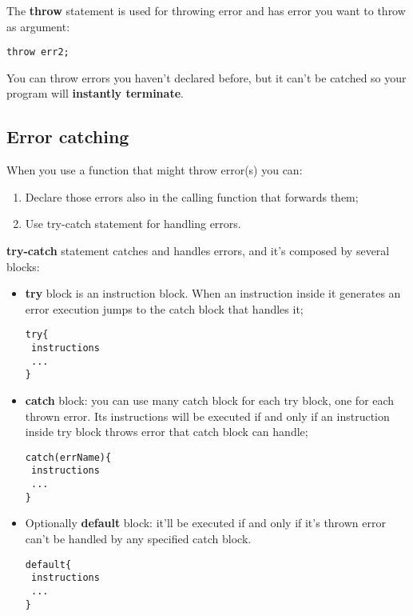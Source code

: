 \documentclass[10pt]{book}%
\renewcommand{\emph}[1]{\textbf{#1}}
\newenvironment{codeenv}{
\begin{mdframed}[backgroundcolor=black!20,topline=false,leftline=false,rightline=false,bottomline=false]
}
{\end{mdframed}}
\begin{document}
The \emph{throw} statement is used for throwing error and has error you want to throw as argument:
\begin{codeenv}
\begin{verbatim}
throw err2;
\end{verbatim}
\end{codeenv}

You can throw errors you haven't declared before, but it can't be catched so your program will \emph{instantly terminate}.

\subsection{Error catching}
When you use a function that might throw error(s) you can:
\begin{enumerate}
\item Declare those errors also in the calling function that forwards them;
\item Use try-catch statement for handling errors. 
\end{enumerate}
\emph{try-catch} statement catches and handles errors, and it's composed by several blocks:
\begin{itemize}
\item \emph{try} block is an instruction block. When an instruction inside it generates an error execution jumps to the catch block that handles it;
\begin{codeenv}
\begin{verbatim}
try{
 instructions
 ...
}
\end{verbatim}
\end{codeenv}
\item \emph{catch} block: you can use many catch block for each try block, one for each thrown error. Its instructions will be executed if and only if an instruction inside try block throws error that catch block can handle;
\begin{codeenv}
\begin{verbatim}
catch(errName){
 instructions
 ...
}

\end{verbatim}
\end{codeenv}
\item Optionally \emph{default} block: it'll be executed if and only if it's thrown error can't be handled by any specified catch block.
\begin{codeenv}
\begin{verbatim}
default{
 instructions
 ...
}
\end{verbatim}
\end{codeenv}
\end{itemize}
\end{document}
